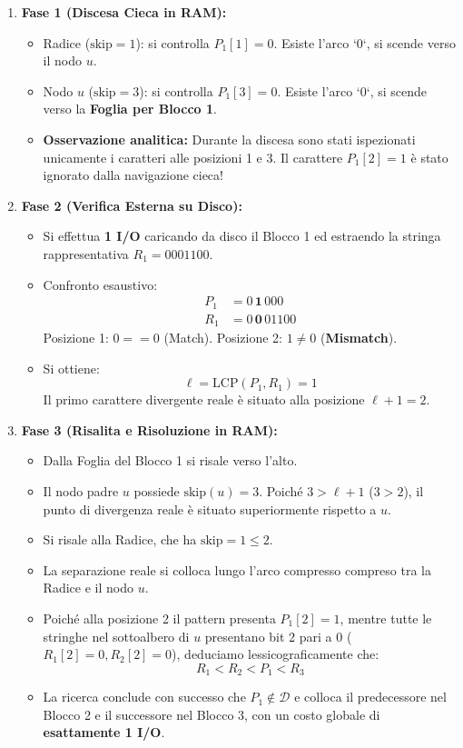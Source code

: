 \begin{enumerate}
  \item \textbf{Fase 1 (Discesa Cieca in RAM):}
  \begin{itemize}
    \item Radice ($\text{skip} = 1$): si controlla $P_1[1] = 0$. Esiste l'arco `0`, si scende verso il nodo $u$.
    \item Nodo $u$ ($\text{skip} = 3$): si controlla $P_1[3] = 0$. Esiste l'arco `0`, si scende verso la \textbf{Foglia per Blocco 1}.
    \item \textbf{Osservazione analitica:} Durante la discesa sono stati ispezionati unicamente i caratteri alle posizioni 1 e 3. Il carattere $P_1[2] = 1$ \`e stato ignorato dalla navigazione cieca!
  \end{itemize}
  \item \textbf{Fase 2 (Verifica Esterna su Disco):}
  \begin{itemize}
    \item Si effettua \textbf{1 I/O} caricando da disco il Blocco 1 ed estraendo la stringa rappresentativa $R_1 = 0001100$.
    \item Confronto esaustivo:
    \begin{align*}
      P_1 &= 0 \, \mathbf{1} \, 000 \\
      R_1 &= 0 \, \mathbf{0} \, 01100
    \end{align*}
    Posizione 1: $0 == 0$ (Match). Posizione 2: $1 \neq 0$ (\textbf{Mismatch}).
    \item Si ottiene:
    \begin{equation}
      \ell = \text{LCP}(P_1, R_1) = 1
    \end{equation}
    Il primo carattere divergente reale \`e situato alla posizione $\ell + 1 = 2$.
  \end{itemize}
  \item \textbf{Fase 3 (Risalita e Risoluzione in RAM):}
  \begin{itemize}
    \item Dalla Foglia del Blocco 1 si risale verso l'alto.
    \item Il nodo padre $u$ possiede $\text{skip}(u) = 3$. Poich\'e $3 > \ell + 1$ ($3 > 2$), il punto di divergenza reale \`e situato superiormente rispetto a $u$.
    \item Si risale alla Radice, che ha $\text{skip} = 1 \le 2$.
    \item La separazione reale si colloca lungo l'arco compresso compreso tra la Radice e il nodo $u$.
    \item Poich\'e alla posizione 2 il pattern presenta $P_1[2] = 1$, mentre tutte le stringhe nel sottoalbero di $u$ presentano bit 2 pari a $0$ ($R_1[2]=0, R_2[2]=0$), deduciamo lessicograficamente che:
    \begin{equation}
      R_1 < R_2 < P_1 < R_3
    \end{equation}
    \item La ricerca conclude con successo che $P_1 \notin \mathcal{D}$ e colloca il predecessore nel Blocco 2 e il successore nel Blocco 3, con un costo globale di \textbf{esattamente 1 I/O}.
  \end{itemize}
\end{enumerate}

